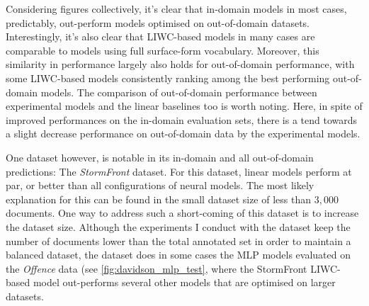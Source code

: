 Considering figures collectively, it's clear that in-domain models in most cases, predictably, out-perform models optimised on out-of-domain datasets.  
Interestingly, it's also clear that LIWC-based models in many cases are comparable to models using full surface-form vocabulary.  
Moreover, this similarity in performance largely also holds for out-of-domain performance, with some LIWC-based models consistently ranking among the best performing out-of-domain models.  
The comparison of out-of-domain performance between experimental models and the linear baselines too is worth noting.  
Here, in spite of improved performances on the in-domain evaluation sets, there is a tend towards a slight decrease performance on out-of-domain data by the experimental models.  
  
One dataset however, is notable in its in-domain and all out-of-domain predictions: The \textit{StormFront} dataset.  
For this dataset, linear models perform at par, or better than all configurations of neural models.  
The most likely explanation for this can be found in the small dataset size of less than $3,000$ documents.  
One way to address such a short-coming of this dataset is to increase the dataset size.  
Although the experiments I conduct with the dataset keep the number of documents lower than the total annotated set in order to maintain a balanced dataset, the dataset does in some cases   
the MLP models evaluated on the \textit{Offence} data (see \cref{fig:davidson_mlp_test}, where the StormFront LIWC-based model out-performs several other models that are optimised on larger datasets.  
  
